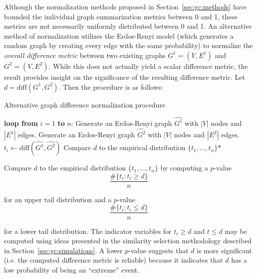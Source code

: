 Although the normalization methods proposed in Section~\ref{sec:gc:methods} 
have bounded the individual graph summarization metrics between 0 and 1, these 
metrics are not necessarily uniformly distributed between 0 and 1. An 
alternative method of normalization utilizes the Erdos-Renyi model (which 
generates a random graph by creating every edge with the same probability) to 
normalize the \textit{overall difference metric} between 
two existing graphs $G^1=(V,E^1)$ and $G^2=(V,E^2)$. While this does not 
actually yield a scalar difference metric, the result provides insight on 
the significance of the resulting difference metric.
Let $d = \text{diff}(G^1,G^2)$. Then the procedure is as follows:

\tablespacing
\begin{algorithm}[H]
	\caption{Alternative graph difference 
	normalization procedure}\label{alg:gc:simulations:extension}
	\begin{algorithmic}[1]
		\State \textbf{loop from} $i=1$ \textbf{to} $n$:
		\State \indent Generate an Erdos-Renyi graph $\hat{G^1}$ with 
		$|V|$ nodes and $|E^1|$ edges.
		\State \indent Generate an Erdos-Renyi graph $\hat{G^2}$ with 
		$|V|$ nodes and $|E^2|$ edges.
		\State \indent $t_i \gets \text{diff}(\hat{G^1},\hat{G^2})$
		\State Compare $d$ to the empirical distribution $\{t_1,...,t_n\}$*
		\EndProcedure
	\end{algorithmic}
\end{algorithm}
\bodyspacing
 
\noindent *Compare $d$ to the empirical distribution $\{t_1,...,t_n\}$ by 
computing a $p$-value
$$\frac{\#\{t_i : t_i\geq d \}}{n}$$

\noindent for an upper tail distribution and a $p$-value
$$\frac{\#\{t_i : t_i \leq d \}}{n}$$

\noindent for a lower tail distribution. The indicator variables for $t_i\geq 
d$ and $t \leq d$ may be computed using ideas presented in
the similarity selection methodology described in 
Section~\ref{sec:gc:simulations}. A lower $p$-value 
suggests that $d$ is more significant (i.e. the computed difference metric is 
reliable) because it indicates that $d$ has a low probability of being an 
``extreme'' event.